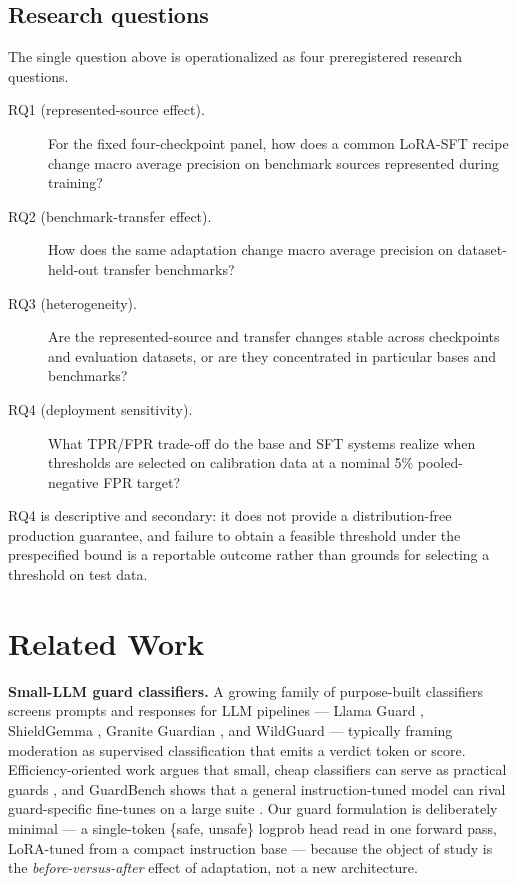 \documentclass[sigconf,nonacm]{acmart}
\begin{document}
\subsection{Research questions}
\label{sec:rqs}

The single question above is operationalized as four preregistered research questions.

\begin{description}
  \item[RQ1 (represented-source effect).] For the fixed four-checkpoint panel, how does a common LoRA-SFT recipe change macro average precision on benchmark sources represented during training?
  \item[RQ2 (benchmark-transfer effect).] How does the same adaptation change macro average precision on dataset-held-out transfer benchmarks?
  \item[RQ3 (heterogeneity).] Are the represented-source and transfer changes stable across checkpoints and evaluation datasets, or are they concentrated in particular bases and benchmarks?
  \item[RQ4 (deployment sensitivity).] What TPR/FPR trade-off do the base and SFT systems realize when thresholds are selected on calibration data at a nominal 5\% pooled-negative FPR target?
\end{description}

RQ4 is descriptive and secondary: it does not provide a distribution-free production guarantee, and failure to obtain a feasible threshold under the prespecified bound is a reportable outcome rather than grounds for selecting a threshold on test data.

\section{Related Work}
\label{sec:related}

\textbf{Small-LLM guard classifiers.} A growing family of purpose-built classifiers screens prompts and responses for LLM pipelines --- Llama Guard \cite{inan2023llamaguard,meta2024llamaguard3_1b}, ShieldGemma \cite{zeng2024shieldgemma}, Granite Guardian \cite{padhi2024graniteguardian}, and WildGuard \cite{han2024wildguard} --- typically framing moderation as supervised classification that emits a verdict token or score. Efficiency-oriented work argues that small, cheap classifiers can serve as practical guards \cite{majhi2025gpuguard}, and GuardBench shows that a general instruction-tuned model can rival guard-specific fine-tunes on a large suite \cite{bassani2024guardbench}. Our guard formulation is deliberately minimal --- a single-token \{safe, unsafe\} logprob head read in one forward pass, LoRA-tuned from a compact instruction base \cite{bakouch2025smollm3,hu2021lora} --- because the object of study is the \emph{before-versus-after} effect of adaptation, not a new architecture.
\end{document}
